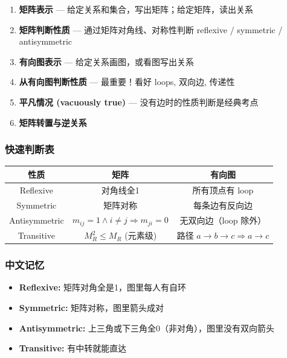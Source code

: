 \documentclass[10pt,a4paper,openany]{ctexbook}
\theoremstyle{definition}
\theoremstyle{remark}
\begin{document}
\begin{enumerate}
\item \textbf{矩阵表示} — 给定关系和集合，写出矩阵；给定矩阵，读出关系
\item \textbf{矩阵判断性质} — 通过矩阵对角线、对称性判断 reflexive / symmetric / antisymmetric
\item \textbf{有向图表示} — 给定关系画图，或看图写出关系
\item \textbf{从有向图判断性质} — 最重要！看好 loops, 双向边, 传递性
\item \textbf{平凡情况 (vacuously true)} — 没有边时的性质判断是经典考点
\item \textbf{矩阵转置与逆关系}

\end{enumerate}

\subsubsection{快速判断表}

\begin{center}
\begin{tabular}{ccc}
\hline
性质 & 矩阵 & 有向图 \\ \hline
Reflexive & 对角线全1 & 所有顶点有 loop \\
Symmetric & 矩阵对称 & 每条边有反向边 \\
Antisymmetric & $m_{ij}=1 \land i\neq j \Rightarrow m_{ji}=0$ & 无双向边（loop 除外） \\
Transitive & $M_R^2 \le M_R$ (元素级) & 路径 $a\to b\to c \Rightarrow a\to c$ \\
\hline
\end{tabular}

\end{center}

\subsubsection{中文记忆}

\begin{itemize}
\item \textbf{Reflexive:} 矩阵对角全是1，图里每人有自环
\item \textbf{Symmetric:} 矩阵对称，图里箭头成对
\item \textbf{Antisymmetric:} 上三角或下三角全0（非对角），图里没有双向箭头
\item \textbf{Transitive:} 有中转就能直达

\end{itemize}
\end{document}
